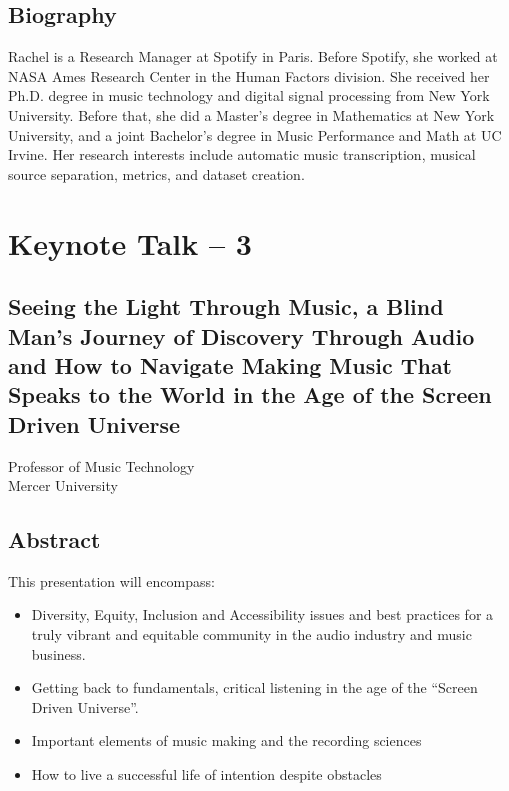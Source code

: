 \subsection*{Biography}
Rachel is a Research Manager at Spotify in Paris. Before Spotify, she worked at NASA Ames Research Center in the Human Factors division. She received her Ph.D. degree in music technology and digital signal processing from New York University. Before that, she did a Master's degree in Mathematics at New York University, and a joint Bachelor's degree in Music Performance and Math at UC Irvine. Her research interests include automatic music transcription, musical source separation, metrics, and dataset creation.

\clearpage

{}
\section*{Keynote Talk -- 3}
\subsection*{Seeing the Light Through Music, a Blind Man's Journey of Discovery Through Audio and How to Navigate Making Music That Speaks to the World in the Age of the Screen Driven Universe}

Professor of Music Technology\\
Mercer University

\subsection*{Abstract}
This presentation will encompass:
\begin{itemize}
\item Diversity, Equity, Inclusion and Accessibility issues and best practices for a truly vibrant and equitable community in the audio industry and music business.
\item Getting back to fundamentals, critical listening in the age of the ``Screen Driven Universe''.
\item Important elements of music making and the recording sciences
\item How to live a successful life of intention despite obstacles
\end{itemize}


